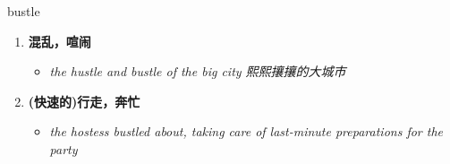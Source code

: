 
\begin{frame}
{\huge bustle}
\begin{center}
\begin{enumerate}\Large
  \item \textbf{混乱，喧闹}
  \begin{itemize}
    \item \em{\Large{the hustle and bustle of the big city 熙熙攘攘的大城市}}
  \end{itemize}
  \item \textbf{(快速的)行走，奔忙}
  \begin{itemize}
    \item \em{\Large{the hostess bustled about, taking care of last-minute preparations for the party}}
  \end{itemize}
\end{enumerate}
\end{center}
\end{frame}
